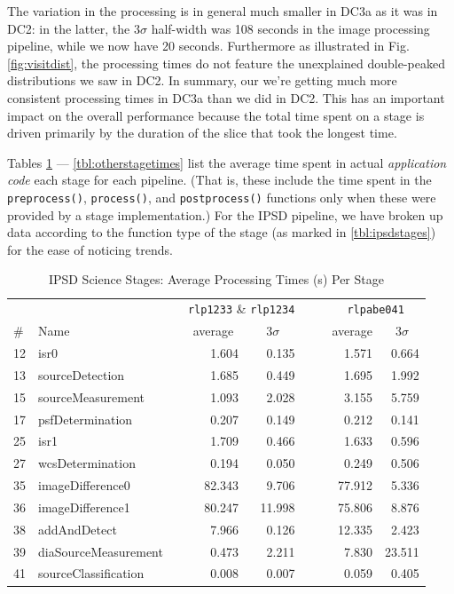 The variation in the processing is in general much smaller in DC3a as
it was in DC2: in the latter, the $3\sigma$ half-width was 108
seconds in the image processing pipeline, while we now have 20
seconds.  Furthermore as illustrated in Fig. \ref{fig:visitdist}, the
processing times do not feature the unexplained double-peaked
distributions we saw in DC2.  In summary, our we're getting much more
consistent processing times in DC3a than we did in DC2.  This has an
important impact on the overall performance because the total time
spent on a stage is driven primarily by the duration of the slice that
took the longest time.  

Tables \ref{tbl:scistagetimes} --- \ref{tbl:otherstagetimes} list
the average time spent in actual {\it application code} each stage for
each pipeline.  (That is, these include the time spent in the {\tt
preprocess()}, {\tt process()}, and {\tt postprocess()} functions
only when these were provided by a stage implementation.)  For the
IPSD pipeline, we have broken up data according to the function type
of the stage (as marked in \ref{tbl:ipsdstages}) for the ease of
noticing trends.  

\begin{table}[htbp]
\begin{center}
\caption{IPSD Science Stages: Average Processing Times (s) Per Stage
\label{tbl:scistagetimes}}
\vspace{\baselineskip}
\begin{tabular}{llcrrc|crr}
\hline\hline
   &      && \multicolumn{2}{c}{{\tt rlp1233} \& {\tt rlp1234}} 
         &&& \multicolumn{2}{c}{{\tt rlpabe041}} \\
\# & Name && \multicolumn{1}{c}{average}&\multicolumn{1}{c}{$3\sigma$} 
         &&& \multicolumn{1}{c}{average}&\multicolumn{1}{c}{$3\sigma$} \\ 
\hline
12 &                  isr0 &&  1.604 &  0.135 &&&  1.571 &  0.664 \\  %
13 &       sourceDetection &&  1.685 &  0.449 &&&  1.695 &  1.992 \\  %
15 &     sourceMeasurement &&  1.093 &  2.028 &&&  3.155 &  5.759 \\  %
17 &      psfDetermination &&  0.207 &  0.149 &&&  0.212 &  0.141 \\  %
25 &                  isr1 &&  1.709 &  0.466 &&&  1.633 &  0.596 \\  %
27 &      wcsDetermination &&  0.194 &  0.050 &&&  0.249 &  0.506 \\  %
35 &      imageDifference0 && 82.343 &  9.706 &&& 77.912 &  5.336 \\  %
36 &      imageDifference1 && 80.247 & 11.998 &&& 75.806 &  8.876 \\  %
38 &          addAndDetect &&  7.966 &  0.126 &&& 12.335 &  2.423 \\  %
39 &  diaSourceMeasurement &&  0.473 &  2.211 &&&  7.830 & 23.511 \\  %
41 &  sourceClassification &&  0.008 &  0.007 &&&  0.059 &  0.405 \\  %
\hline
\end{tabular}
\end{center}
\end{table}

